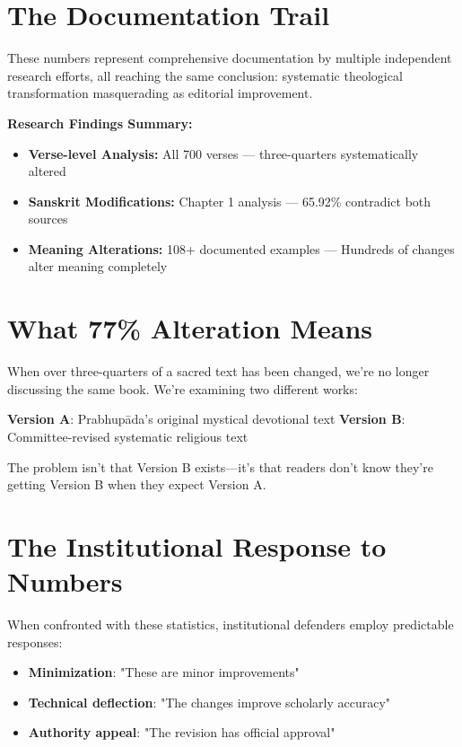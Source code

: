 \documentclass[11pt,twoside]{book}
\begin{document}
\section*{The Documentation Trail}
\label{sec:org4346ac2}

These numbers represent comprehensive documentation by multiple independent research efforts, all reaching the same conclusion: systematic theological transformation masquerading as editorial improvement.

\textbf{\textbf{Research Findings Summary:}}

\begin{itemize}
\item \textbf{\textbf{Verse-level Analysis:}} All 700 verses — three-quarters systematically altered
\item \textbf{\textbf{Sanskrit Modifications:}} Chapter 1 analysis — 65.92\% contradict both sources
\item \textbf{\textbf{Meaning Alterations:}} 108+ documented examples — Hundreds of changes alter meaning completely
\end{itemize}
\section*{What 77\% Alteration Means}
\label{sec:org2be5ab5}

When over three-quarters of a sacred text has been changed, we're no longer discussing the same book. We're examining two different works:

\textbf{\textbf{Version A}}: Prabhupāda's original mystical devotional text
\textbf{\textbf{Version B}}: Committee-revised systematic religious text

The problem isn't that Version B exists—it's that readers don't know they're getting Version B when they expect Version A.
\section*{The Institutional Response to Numbers}
\label{sec:org9390e13}

When confronted with these statistics, institutional defenders employ predictable responses:

\begin{itemize}
\item \textbf{\textbf{Minimization}}: "These are minor improvements"
\item \textbf{\textbf{Technical deflection}}: "The changes improve scholarly accuracy"
\item \textbf{\textbf{Authority appeal}}: "The revision has official approval"
\end{itemize}
\end{document}
